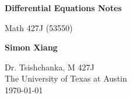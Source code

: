 \documentclass{article}
\begin{document}
\begin{titlepage}
    \begin{center}
        \vspace*{1cm}
 
        \Huge
        \textbf{Differential Equations Notes}
 
        \vspace{0.5cm}
        \LARGE
        Math 427J (53550)

        \vspace{1.5cm}
 
        \textbf{Simon Xiang}
 
        \vfill
  
        \vspace{0.8cm}
 
        \Large
    	Dr. Tsishchanka, M 427J\\
        The University of Texas at Austin\\
        \today
 
    \end{center}
\end{titlepage}
    
\end{document}
